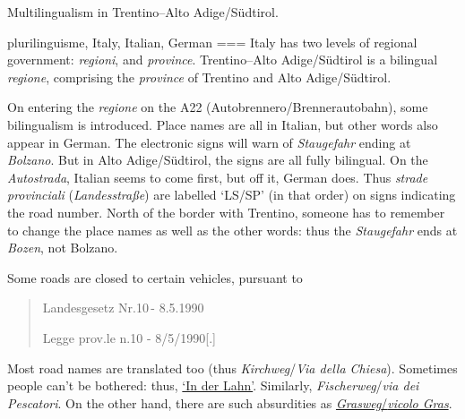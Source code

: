Multilingualism in Trentino–Alto Adige/Südtirol.

plurilinguisme, Italy, Italian, German
===
Italy has two levels of regional government: \emph{regioni}, and \emph{province}. Trentino–Alto Adige/Südtirol is a bilingual \emph{regione}, comprising the \emph{province} of Trentino and Alto Adige/Südtirol.

On entering the \emph{regione} on the A22 (Autobrennero/Brennerautobahn), some bilingualism is introduced. Place names are all in Italian, but other words also appear in German. The electronic signs will warn of \emph{Staugefahr} ending at \emph{Bolzano}. But in Alto Adige/Südtirol, the signs are all fully bilingual. On the \emph{Autostrada}, Italian seems to come first, but off it, German does. Thus \emph{strade provinciali} (\emph{Landesstraße}) are labelled ‘LS/SP’ (in that order) on signs indicating the road number. North of the border with Trentino, someone has to remember to change the place names as well as the other words: thus the \emph{Staugefahr} ends at \emph{Bozen}, not Bolzano.

Some roads are closed to certain vehicles, pursuant to
\begin{quote}
    Landesgesetz Nr.10 - 8.5.1990

    Legge prov.le n.10 - 8/5/1990[.]
\end{quote}

Most road names are translated too (thus \emph{Kirchweg}/\emph{Via della Chiesa}). Sometimes people can’t be bothered: thus, \href{https://maps.app.goo.gl/TRsLnrE4dhKzfsH96}{‘In der Lahn’}. Similarly, \emph{Fischerweg}/\emph{via dei Pescatori}. On the other hand, there are such absurdities as \href{https://maps.app.goo.gl/my7E59X28LyVMTeY9}{\emph{Grasweg}/\emph{vicolo Gras}}.